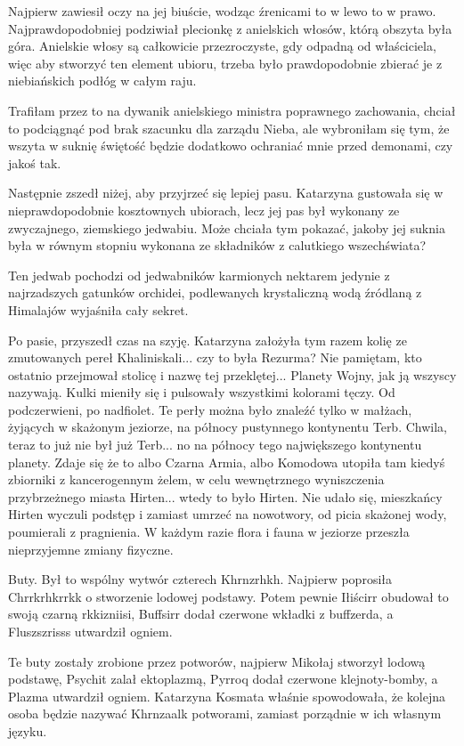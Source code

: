 Najpierw zawiesił oczy na jej biuście, wodząc źrenicami to w lewo to w prawo.
Najprawdopodobniej podziwiał plecionkę z anielskich włosów, którą obszyta była góra.
Anielskie włosy są całkowicie przezroczyste, gdy odpadną od właściciela, więc
aby stworzyć ten element ubioru, trzeba było prawdopodobnie zbierać je z niebiańskich podłóg w całym raju.
\begin{dialogue}
\ds{} Trafiłam przez to na dywanik anielskiego ministra poprawnego zachowania, chciał to podciągnąć pod brak szacunku dla zarządu Nieba, ale wybroniłam się tym, że wszyta w suknię świętość
będzie dodatkowo ochraniać mnie przed demonami, czy jakoś tak.
\end{dialogue}

Następnie zszedł niżej, aby przyjrzeć się lepiej pasu.
Katarzyna gustowała się w nieprawdopodobnie kosztownych ubiorach, lecz jej pas był wykonany ze zwyczajnego, ziemskiego jedwabiu.
Może chciała tym pokazać, jakoby jej suknia była w równym stopniu wykonana ze składników z calutkiego wszechświata?
\begin{dialogue}
\ds{} Ten jedwab pochodzi od jedwabników karmionych nektarem jedynie z najrzadszych gatunków orchidei, podlewanych krystaliczną wodą źródlaną z Himalajów
\dm{} wyjaśniła cały sekret.
\end{dialogue}

Po pasie, przyszedł czas na szyję. Katarzyna założyła tym razem kolię ze zmutowanych pereł Khaliniskali...
czy to była Rezurma? Nie pamiętam, kto ostatnio przejmował stolicę i nazwę tej przeklętej... Planety Wojny, jak ją wszyscy nazywają.
Kulki mieniły się i pulsowały wszystkimi kolorami tęczy. Od podczerwieni, po nadfiolet.
Te perły można było znaleźć tylko w małżach, żyjących w skażonym jeziorze, na północy pustynnego kontynentu Terb. Chwila, teraz to już nie był już Terb... no na północy tego największego kontynentu planety.
Zdaje się że to albo Czarna Armia, albo Komodowa utopiła tam kiedyś zbiorniki z kancerogennym żelem, w celu wewnętrznego wyniszczenia przybrzeżnego miasta Hirten... wtedy to było Hirten.
Nie udało się, mieszkańcy Hirten wyczuli podstęp i zamiast umrzeć na nowotwory, od picia skażonej wody, poumierali z pragnienia.
W każdym razie flora i fauna w jeziorze przeszła nieprzyjemne zmiany fizyczne.

Buty. Był to wspólny wytwór czterech Khrnzrhkh.
Najpierw poprosiła Chrrkrhkrrkk o stworzenie lodowej podstawy.
Potem pewnie Iłiścirr obudował to swoją czarną rkkizniisi, Buffsirr dodał czerwone wkładki z buffzerda, a Fluszszrisss utwardził ogniem.
\begin{dialogue}
\ds{} Te buty zostały zrobione przez potworów, najpierw Mikołaj stworzył lodową podstawę, Psychit zalał ektoplazmą, Pyrroq dodał czerwone klejnoty-bomby, a Plazma utwardził ogniem. \dm{}
Katarzyna Kosmata właśnie spowodowała, że kolejna osoba będzie nazywać Khrnzaalk potworami, zamiast porządnie w ich własnym języku.
\end{dialogue}

